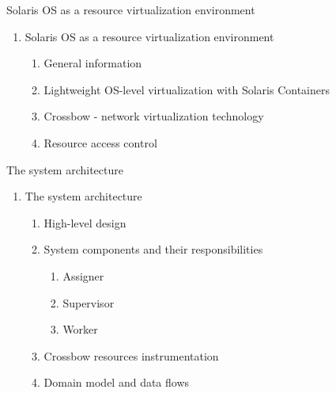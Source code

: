\documentclass{beamer}
\begin{document}
\begin{frame}{Solaris OS as a resource virtualization environment}

	\begin{enumerate}
		\setcounter{enumi}{\value{enumi_chapter}}

		\item Solaris OS as a resource virtualization environment

			\begin{enumerate}
				\item General information
				\item Lightweight OS-level virtualization with Solaris Containers
				\item Crossbow - network virtualization technology
				\item Resource access control
			\end{enumerate}

	\end{enumerate}

\end{frame}

\setcounter{enumi_chapter}{\value{enumi}}


\begin{frame}{The system architecture}

	\begin{enumerate}
		\setcounter{enumi}{\value{enumi_chapter}}

		\item The system architecture

		\begin{enumerate}
			\item High-level design \pause
			\item System components and their responsibilities

				\begin{enumerate}
					\item Assigner
					\item Supervisor
					\item Worker
				\end{enumerate}

				\pause
			
			\item Crossbow resources instrumentation \pause
			\item Domain model and data flows
		\end{enumerate}

	\end{enumerate}

\end{frame}
\end{document}
